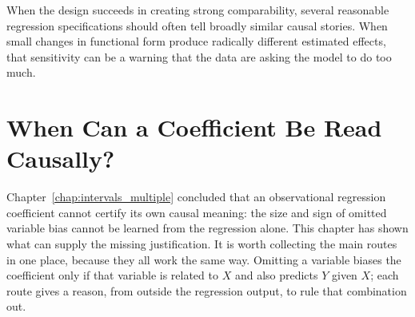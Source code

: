 \documentclass[11pt]{report}
\begin{document}
When the design succeeds in creating strong comparability, several reasonable regression specifications should often tell broadly similar causal stories. When small changes in functional form produce radically different estimated effects, that sensitivity can be a warning that the data are asking the model to do too much.

\section{When Can a Coefficient Be Read Causally?}
\label{sec:causal_reading}

Chapter~\ref{chap:intervals_multiple} concluded that an observational regression coefficient cannot certify its own causal meaning: the size and sign of omitted variable bias cannot be learned from the regression alone. This chapter has shown what can supply the missing justification. It is worth collecting the main routes in one place, because they all work the same way. Omitting a variable biases the coefficient only if that variable is related to \(X\) and also predicts \(Y\) given \(X\); each route gives a reason, from outside the regression output, to rule that combination out.
\end{document}
